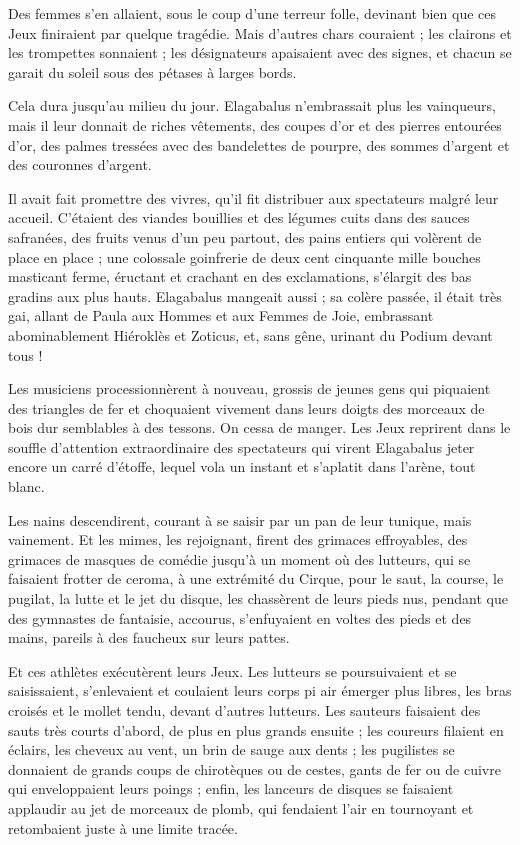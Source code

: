 \documentclass[a4paper, 11pt, oneside, polutonikogreek, french]{article}
\begin{document}
Des femmes s'en allaient, sous le coup d'une terreur folle, devinant bien que ces Jeux finiraient par quelque tragédie. Mais d'autres chars couraient ; les clairons et les trompettes sonnaient ; les désignateurs apaisaient avec des signes, et chacun se garait du soleil sous des pétases à larges bords.

Cela dura jusqu'au milieu du jour. Elagabalus n'embrassait plus les vainqueurs, mais il leur donnait de riches vêtements, des coupes d'or et des pierres entourées d'or, des palmes tressées avec des bandelettes de pourpre, des sommes d'argent et des couronnes d'argent.

Il avait fait promettre des vivres, qu'il fit distribuer aux spectateurs malgré leur accueil. C'étaient des viandes bouillies et des légumes cuits dans des sauces safranées, des fruits venus d'un peu partout, des pains entiers qui volèrent de place en place ; une colossale goinfrerie de deux cent cinquante mille bouches masticant ferme, éructant et crachant en des exclamations, s'élargit des bas gradins aux plus hauts. Elagabalus mangeait aussi ; sa colère passée, il était très gai, allant de Paula aux Hommes et aux Femmes de Joie, embrassant abominablement Hiéroklès et Zoticus, et, sans gêne, urinant du Podium devant tous !

Les musiciens processionnèrent à nouveau, grossis de jeunes gens qui piquaient des triangles de fer et choquaient vivement dans leurs doigts des morceaux de bois dur semblables à des tessons. On cessa de manger. Les Jeux reprirent dans le souffle d'attention extraordinaire des spectateurs qui virent Elagabalus jeter encore un carré d'étoffe, lequel vola un instant et s'aplatit dans l'arène, tout blanc.

Les nains descendirent, courant à se saisir par un pan de leur tunique, mais vainement. Et les mimes, les rejoignant, firent des grimaces effroyables, des grimaces de masques de comédie jusqu'à un moment où des lutteurs, qui se faisaient frotter de ceroma, à une extrémité du Cirque, pour le saut, la course, le pugilat, la lutte et le jet du disque, les chassèrent de leurs pieds nus, pendant que des gymnastes de fantaisie, accourus, s'enfuyaient en voltes des pieds et des mains, pareils à des faucheux sur leurs pattes.

Et ces athlètes exécutèrent leurs Jeux. Les lutteurs se poursuivaient et se saisissaient, s'enlevaient et coulaient leurs corps pi air émerger plus libres, les bras croisés et le mollet tendu, devant d'autres lutteurs. Les sauteurs faisaient des sauts très courts d'abord, de plus en plus grands ensuite ; les coureurs filaient en éclairs, les cheveux au vent, un brin de sauge aux dents ; les pugilistes se donnaient de grands coups de chirotèques ou de cestes, gants de fer ou de cuivre qui enveloppaient leurs poings ; enfin, les lanceurs de disques se faisaient applaudir au jet de morceaux de plomb, qui fendaient l'air en tournoyant et retombaient juste à une limite tracée.
\end{document}
